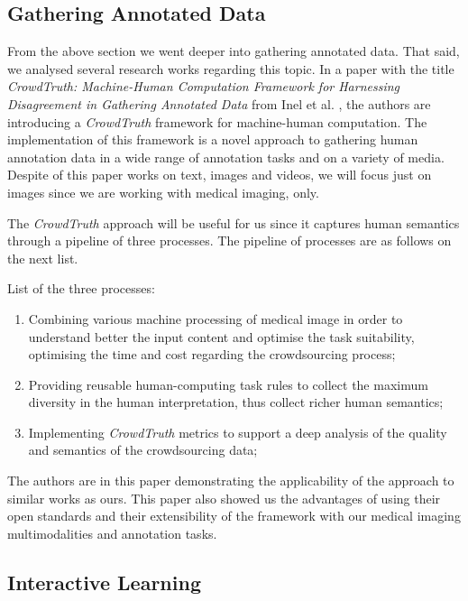 \clearpage

\subsection{Gathering Annotated Data}

From the above section we went deeper into gathering annotated data. That said, we analysed several research works regarding this topic. In a paper with the title \textit{CrowdTruth: Machine-Human Computation Framework for Harnessing Disagreement in Gathering Annotated Data} from Inel et al. \cite{inel2014crowdtruth}, the authors are introducing a \textit{CrowdTruth} framework for machine-human computation. The implementation of this framework is a novel approach to gathering human annotation data in a wide range of annotation tasks and on a variety of media. Despite of this paper works on text, images and videos, we will focus just on images since we are working with medical imaging, only.

The \textit{CrowdTruth} approach will be useful for us since it captures human semantics through a pipeline of three processes. The pipeline of processes are as follows on the next list.

\hfill

List of the three processes:

\hfill

\begin{enumerate}
\item Combining various machine processing of medical image in order to understand better the input content and optimise the task suitability, optimising the time and cost regarding the crowdsourcing process;
\item Providing reusable human-computing task rules to collect the maximum diversity in the human interpretation, thus collect richer human semantics;
\item Implementing \textit{CrowdTruth} metrics to support a deep analysis of the quality and semantics of the crowdsourcing data;
\end{enumerate}

\hfill

The authors are in this paper demonstrating the applicability of the approach to similar works as ours. This paper also showed us the advantages of using their open standards and their extensibility of the framework with our medical imaging multimodalities and annotation tasks.

\subsection{Interactive Learning}

